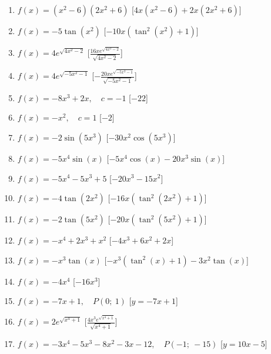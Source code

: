 \begin{enumerate}
\begin{enumerate}
\item \(f(x) = \left(x^{2} - 6\right) \left(2 x^{2} + 6\right)\) \hfill [\(4 x 
\left(x^{2} - 6\right) + 2 x \left(2 x^{2} + 6\right)\)]
\item \(f(x) = - 5 \tan{\left (x^{2} \right )}\) \hfill [\(- 10 x 
\left(\tan^{2}{\left (x^{2} \right )} + 1\right)\)]
\item \(f(x) = 4 e^{\sqrt{4 x^{2} - 2}}\) \hfill [\(\frac{16 x e^{\sqrt{4 x^{2} 
- 2}}}{\sqrt{4 x^{2} - 2}}\)]
\item \(f(x) = 4 e^{\sqrt{- 5 x^{2} - 1}}\) \hfill [\(- \frac{20 x e^{\sqrt{- 5 
x^{2} - 1}}}{\sqrt{- 5 x^{2} - 1}}\)]
\item \(f(x)= - 8 x^{3} + 2 x,\quad c=-1\) \hfill [\(-22\)]
\item \(f(x)= - x^{2},\quad c=1\) \hfill [\(-2\)]
\item \(f(x) = - 2 \sin{\left (5 x^{3} \right )}\) \hfill [\(- 30 x^{2} 
\cos{\left (5 x^{3} \right )}\)]
\item \(f(x) = - 5 x^{4} \sin{\left (x \right )}\) \hfill [\(- 5 x^{4} 
\cos{\left (x \right )} - 20 x^{3} \sin{\left (x \right )}\)]
\item \(f(x) = - 5 x^{4} - 5 x^{3} + 5\) \hfill [\(- 20 x^{3} - 15 x^{2}\)]
\item \(f(x) = - 4 \tan{\left (2 x^{2} \right )}\) \hfill [\(- 16 x 
\left(\tan^{2}{\left (2 x^{2} \right )} + 1\right)\)]
\item \(f(x) = - 2 \tan{\left (5 x^{2} \right )}\) \hfill [\(- 20 x 
\left(\tan^{2}{\left (5 x^{2} \right )} + 1\right)\)]
\item \(f(x) = - x^{4} + 2 x^{3} + x^{2}\) \hfill [\(- 4 x^{3} + 6 x^{2} + 2 
x\)]
\item \(f(x) = - x^{3} \tan{\left (x \right )}\) \hfill [\(- x^{3} 
\left(\tan^{2}{\left (x \right )} + 1\right) - 3 x^{2} \tan{\left (x \right 
)}\)]
\item \(f(x) = - 4 x^{4}\) \hfill [\(- 16 x^{3}\)]
\item \(f(x)= - 7 x + 1,\quad P(0;~1)\) \hfill [\(y = - 7 x + 1\)]
\item \(f(x) = 2 e^{\sqrt{x^{4} + 1}}\) \hfill [\(\frac{4 x^{3} e^{\sqrt{x^{4} + 
1}}}{\sqrt{x^{4} + 1}}\)]
\item \(f(x)= - 3 x^{4} - 5 x^{3} - 8 x^{2} - 3 x - 12,\quad P(-1;~-15)\) \hfill 
[\(y = 10 x - 5\)]
\end{enumerate}


\end{enumerate}
